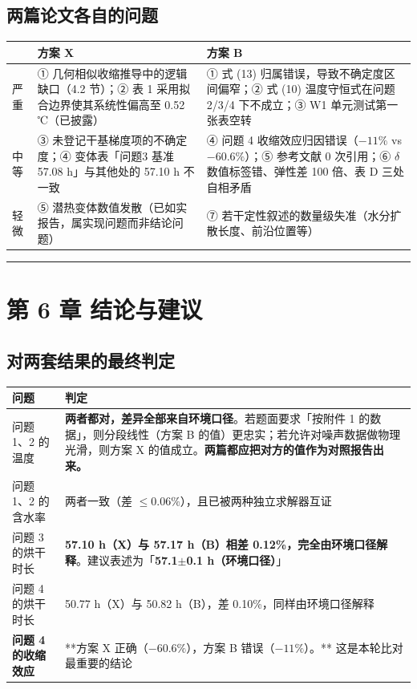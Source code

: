 \subsection{两篇论文各自的问题}


\begin{center}
\small
\begin{tabular}{lll}
\toprule
 & 方案 X & 方案 B \\
\midrule
严重 & ① 几何相似收缩推导中的逻辑缺口（4.2 节）；② 表 1 采用拟合边界使其系统性偏高至 0.52 ℃（已披露） & ① 式 (13) 归属错误，导致不确定度区间偏窄；② 式 (10) 温度守恒式在问题 2/3/4 下不成立；③ W1 单元测试第一张表空转 \\
中等 & ③ 未登记干基梯度项的不确定度；④ 变体表「问题3 基准 57.08 h」与其他处的 57.10 h 不一致 & ④ 问题 4 收缩效应归因错误（$-11\%$ vs $-60.6\%$）；⑤ 参考文献 0 次引用；⑥ $\delta$ 数值标签错、弹性差 100 倍、表 D 三处自相矛盾 \\
轻微 & ⑤ 潜热变体数值发散（已如实报告，属实现问题而非结论问题） & ⑦ 若干定性叙述的数量级失准（水分扩散长度、前沿位置等） \\
\bottomrule
\end{tabular}
\end{center}


\vspace{1mm}\hrule\vspace{1mm}


\section{第 6 章 结论与建议}


\subsection{对两套结果的最终判定}


\begin{center}
\small
\begin{tabular}{ll}
\toprule
问题 & 判定 \\
\midrule
问题 1、2 的温度 & \textbf{两者都对，差异全部来自环境口径}。若题面要求「按附件 1 的数据」，则分段线性（方案 B 的值）更忠实；若允许对噪声数据做物理光滑，则方案 X 的值成立。\textbf{两篇都应把对方的值作为对照报告出来。} \\
问题 1、2 的含水率 & 两者一致（差 $\le0.06\%$），且已被两种独立求解器互证 \\
问题 3 的烘干时长 & \textbf{57.10 h（X）与 57.17 h（B）相差 0.12\%，完全由环境口径解释}。建议表述为「\textbf{57.1$\pm$0.1 h（环境口径）}」 \\
问题 4 的烘干时长 & 50.77 h（X）与 50.82 h（B），差 0.10\%，同样由环境口径解释 \\
\textbf{问题 4 的收缩效应} & **方案 X 正确（$-60.6\%$），方案 B 错误（$-11\%$）。** 这是本轮比对最重要的结论 \\
\bottomrule
\end{tabular}
\end{center}


